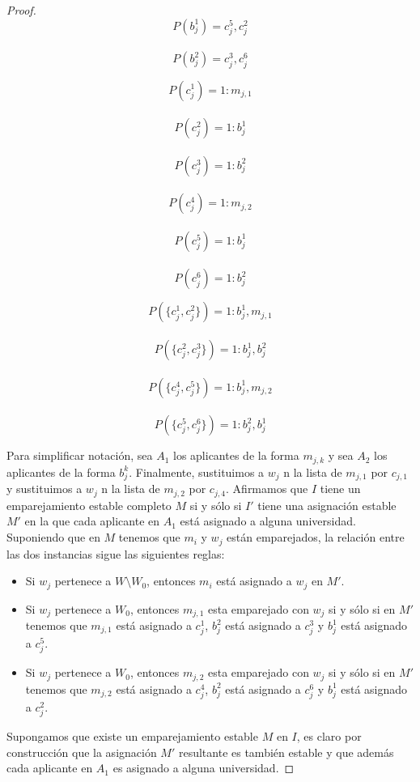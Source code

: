\begin{proof}
\begin{minipage}{.3\linewidth}
$$P(b_j^1)=c_j^5,c_j^2$$ \\
$$P(b_j^2)=c_j^3,c_j^6$$ 
\end{minipage}%
\begin{minipage}{.3\linewidth}
$$P(c_j^1)=1:m_{j,1}$$ \\
$$P(c_j^2)=1:b_j^1$$ \\
$$P(c_j^3)=1: b_j^2$$ \\
$$P(c_j^4)=1: m_{j,2}$$ \\
$$P(c_j^5)=1: b_j^1$$ \\
$$P(c_j^6)=1: b_j^2$$ 
\end{minipage}
\begin{minipage}{.4\linewidth}
$$P(\{c_j^1,c_j^2\})= 1:b_j^1,m_{j,1}$$ \\
$$P(\{c_j^2,c_j^3\})=1:b_j^1,b_j^2$$ \\
$$P(\{c_j^4,c_j^5\})= 1:b_j^1,m_{j,2}$$ \\
$$P(\{c_j^5,c_j^6\})=1:b_j^2,b_j^1$$
\end{minipage}
Para simplificar notación, sea $A_1$ los aplicantes de la forma $m_{j,k}$ y sea $A_2$ los aplicantes de la forma $b_j^k$. Finalmente, sustituimos a $w_j$ n la lista de $m_{j,1}$ por $c_{j,1}$ y sustituimos a $w_j$ n la lista de $m_{j,2}$ por $c_{j,4}$. Afirmamos que $I$ tiene un emparejamiento estable completo $M$ si y sólo si $I'$ tiene una asignación estable $M'$ en la que cada aplicante en $A_1$ está asignado a alguna universidad. Suponiendo que en $M$ tenemos que $m_i$ y $w_j$ están emparejados, la relación entre las dos instancias sigue las siguientes reglas:
\begin{itemize}
\item Si $w_j$ pertenece a $W \setminus W_0$, entonces $m_i$ está asignado a $w_j$ en $M'$.
\item Si $w_j$ pertenece a $W_0$, entonces $m_{j,1}$ esta emparejado con $w_j$ si y sólo si en $M'$ tenemos que $m_{j,1}$ está asignado a $c_j^1$, $b_j^2$ está asignado a $c_j^3$ y $b_j^1$ está asignado a $c_j^5$.
\item Si $w_j$ pertenece a $W_0$, entonces $m_{j,2}$ esta emparejado con $w_j$ si y sólo si en $M'$ tenemos que $m_{j,2}$ está asignado a $c_j^4$, $b_j^2$ está asignado a $c_j^6$ y $b_j^1$ está asignado a $c_j^2$.
\end{itemize}
Supongamos que existe un emparejamiento estable $M$ en $I$, es claro por construcción que la asignación $M'$ resultante es también estable y que además cada aplicante en $A_1$ es asignado a alguna universidad. 


\end{proof}
